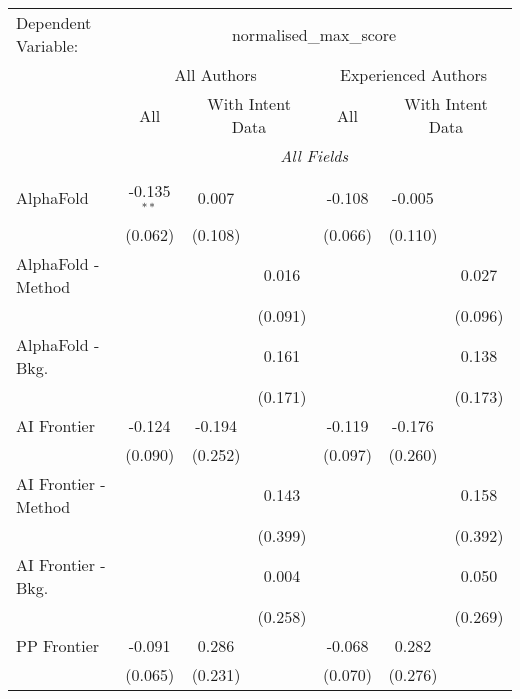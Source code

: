 \begingroup
\centering
\begin{tabular}{lcccccc}
   \tabularnewline \midrule \midrule
   Dependent Variable: & \multicolumn{6}{c}{normalised\_max\_score}\\
 & \multicolumn{3}{c}{All Authors} & \multicolumn{3}{c}{Experienced Authors} \\
\cmidrule(lr){2-4} \cmidrule(lr){5-7}
 & \multicolumn{1}{c}{All} & \multicolumn{2}{c}{With Intent Data} & \multicolumn{1}{c}{All} & \multicolumn{2}{c}{With Intent Data} \\
\cmidrule(lr){2-2} \cmidrule(lr){3-4} \cmidrule(lr){5-5} \cmidrule(lr){6-7}
 & \multicolumn{6}{c}{\textit{All Fields}} \\ \\
   AlphaFold            & -0.135$^{**}$ & 0.007   &             & -0.108  & -0.005  &   \\   
                        & (0.062)       & (0.108) &             & (0.066) & (0.110) &   \\   
   AlphaFold - Method   &               &         & 0.016       &         &         & 0.027\\   
                        &               &         & (0.091)     &         &         & (0.096)\\   
   AlphaFold - Bkg.     &               &         & 0.161       &         &         & 0.138\\   
                        &               &         & (0.171)     &         &         & (0.173)\\   
   AI Frontier          & -0.124        & -0.194  &             & -0.119  & -0.176  &   \\   
                        & (0.090)       & (0.252) &             & (0.097) & (0.260) &   \\   
   AI Frontier - Method &               &         & 0.143       &         &         & 0.158\\   
                        &               &         & (0.399)     &         &         & (0.392)\\   
   AI Frontier - Bkg.   &               &         & 0.004       &         &         & 0.050\\   
                        &               &         & (0.258)     &         &         & (0.269)\\   
   PP Frontier          & -0.091        & 0.286   &             & -0.068  & 0.282   &   \\   
                        & (0.065)       & (0.231) &             & (0.070) & (0.276) &   \\   

\end{tabular}
